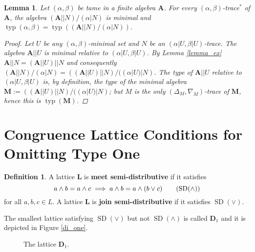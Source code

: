 \documentclass{amsart}
\theoremstyle{plain}
\newtheorem{lemma}[theorem]{Lemma}
\theoremstyle{definition}
\newtheorem{definition}[theorem]{Definition}
\theoremstyle{remark}
\DeclareMathOperator{\typ}{typ}
\DeclareMathOperator{\SD}{SD}
\begin{document}
\begin{lemma}
    Let $(\alpha, \beta)$ be tame in a finite algebra $\mathbf{A}$.
    For every $(\alpha, \beta)$-trace$^*$ of $\mathbf{A}$, the algebra $(\mathbf{A}||N)/(\alpha|N)$ is minimal and $\typ(\alpha, \beta) = \typ((\mathbf{A}||N)/(\alpha|N))$. 
    \begin{proof}
        Let $U$ be any $(\alpha, \beta)$-minimal set and $N$ be an $(\alpha|U, \beta|U)$-trace. 
        The algebra $\mathbf{A}||U$ is minimal relative to $(\alpha|U, \beta|U)$. 
        By Lemma \ref{lemma_ex} $\mathbf{A}||N = (\mathbf{A}||U)||N$ and consequently $(\mathbf{A}||N)/(\alpha|N) = ((\mathbf{A}||U)||N)/((\alpha|U)|N)$. 
        The type of $\mathbf{A}||U$ relative to $(\alpha|U, \beta|U)$ is, by definition, the type of the minimal algebra $\mathbf{M}:= ((\mathbf{A}||U)||N)/((\alpha|U)|N)$; 
        but $M$ is the only $(\Delta_M, \nabla_M)$-trace of $\mathbf{M}$, hence this is $\typ(\mathbf{M})$.
    \end{proof}
\end{lemma}

\section{Congruence Lattice Conditions for Omitting Type One}
\begin{definition}
    A lattice $\mathbf{L}$ is \textbf{meet semi-distributive} if it satisfies 
    \begin{equation}
        \label{meet_semi_d}
        a \land b = a \land c \implies a \land b = a \land (b \lor c) 
        \tag{$\SD(\land)$}
    \end{equation}
    for all $a,b,c \in L$. 
    A lattice $\mathbf{L}$ is \textbf{join semi-distributive} if it satisfies $\SD(\lor)$. 
\end{definition}

The smallest lattice satisfying $\SD(\lor)$ but not $\SD(\land)$ is called $\mathbf{D}_1$ and it is depicted in Figure \ref{di_one}.  
\begin{figure}
    \centering
    \caption{The lattice $\mathbf{D}_1$.}
\end{figure}
\end{document}
